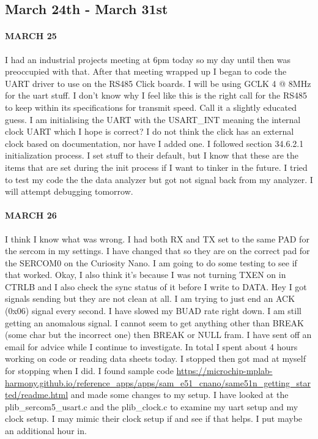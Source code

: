 \documentclass{article}
\begin{document}
\subsection{March 24th - March 31st}
\paragraph{MARCH 25} I had an industrial projects meeting at 6pm today so my day until then was preoccupied with that. After that meeting wrapped up I began to code the UART driver to use on the RS485 Click boards. I will be using GCLK 4 @ 8MHz for the uart stuff. I don't know why I feel like this is the right call for the RS485 to keep within its specifications for transmit speed. Call it a slightly educated guess. I am initialising the UART with the USART\_INT meaning the internal clock UART which I hope is correct? I do not think the click has an external clock based on documentation, nor have I added one. I followed section 34.6.2.1 initialization process. I set stuff to their default, but I know that these are the items that are set during the init process if I want to tinker in the future. I tried to test my code the the data analyzer but got not signal back from my analyzer. I will attempt debugging tomorrow.
\paragraph{MARCH 26} I think I know what was wrong. I had both RX and TX set to the same PAD for the sercom in my settings. I have changed that so they are on the correct pad for the SERCOM0 on the Curiosity Nano. I am going to do some testing to see if that worked. Okay, I also think it's because I was not turning TXEN on in CTRLB and I also check the sync status of it before I write to DATA. Hey I got signals sending but they are not clean at all. I am trying to just end an ACK (0x06) signal every second. I have slowed my BUAD rate right down. I am still getting an anomalous signal. I cannot seem to get anything other than BREAK (some char but the incorrect one) then BREAK or NULL fram. I have sent off an email for advice while I continue to investigate. In total I spent about 4 hours working on code or reading data sheets today. I stopped then got mad at myself for stopping when I did. I found sample code \url{https://microchip-mplab-harmony.github.io/reference_apps/apps/sam_e51_cnano/same51n_getting_started/readme.html} and made some changes to my setup. I have looked at the plib\_sercom5\_usart.c and the plib\_clock.c to examine my uart setup and my clock setup. I may mimic their clock setup if and see if that helps. I put maybe an additional hour in.
\end{document}
